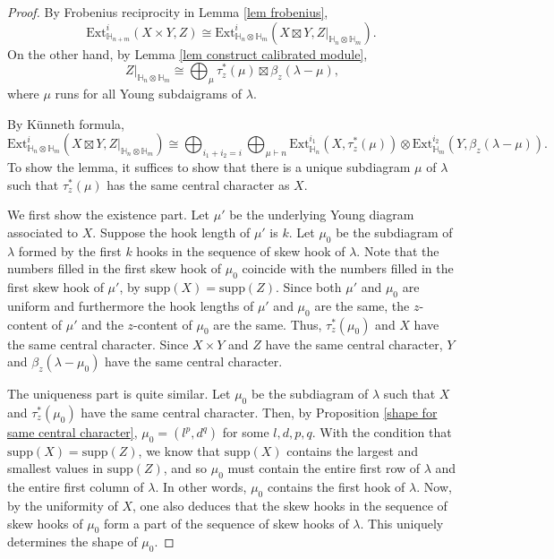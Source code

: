 \documentclass[11pt]{amsart}
\numberwithin{equation}{section}
\theoremstyle{definition}
\begin{document}
\begin{proof}
By Frobenius reciprocity in Lemma \ref{lem frobenius}, 
\[  \mathrm{Ext}^i_{\mathbb H_{n+m}}(X \times Y, Z) \cong \mathrm{Ext}^i_{\mathbb H_n \otimes \mathbb H_m}(X\boxtimes Y, Z|_{\mathbb H_n \otimes \mathbb H_m}) .
\
\]
On the other hand, by Lemma \ref{lem construct calibrated module},
\[ Z|_{\mathbb H_n \otimes \mathbb H_m} \cong \bigoplus_{\mu} \tau^*_z(\mu) \boxtimes \beta_z(\lambda-\mu) ,
\]
where $\mu$ runs for all Young subdaigrams of $\lambda$. 

By K\"unneth formula, 
\begin{equation}
\mathrm{Ext}^i_{\mathbb H_n \otimes \mathbb H_m}(X\boxtimes Y, Z|_{\mathbb H_n \otimes \mathbb H_m}) \cong \bigoplus_{i_1+i_2=i} \bigoplus_{\mu \vdash n} \mathrm{Ext}^{i_1}_{\mathbb H_n}(X, \tau^*_z(\mu)) \otimes \mathrm{Ext}^{i_2}_{\mathbb H_m}(Y, \beta_z(\lambda-\mu)) . 
\end{equation}
To show the lemma, it suffices to show that there is a unique subdiagram $\mu$ of \(\lambda\) such that $\tau_z^*(\mu)$ has the same central character as $X$.

We first show the existence part. Let \(\mu'\) be the underlying Young diagram associated to \(X\). Suppose the hook length of \(\mu'\) is \(k\). Let \(\mu_0\) be the subdiagram of \(\lambda\) formed by the first \(k\) hooks in the sequence of skew hook of \(\lambda\). Note that the numbers filled in the first skew hook of \(\mu_0\) coincide with the numbers filled in the first skew hook of \(\mu'\), by \(\mathrm{supp}(X)=\mathrm{supp}(Z)\). Since both \(\mu'\) and \(\mu_0\) are uniform and furthermore the hook lengths of \(\mu'\) and \(\mu_0\) are the same, the \(z\)-content of \(\mu'\) and the \(z\)-content of \(\mu_0\) are the same. Thus, \(\tau_z^*(\mu_0)\) and \(X\) have the same central character. Since \(X\times Y\) and \(Z\) have the same central character, \(Y\) and \(\beta_z(\lambda-\mu_0)\) have the same central character.

The uniqueness part is quite similar. Let \(\mu_0\) be the subdiagram of \(\lambda\) such that \(X\) and \(\tau_z^*(\mu_0)\) have the same central character. Then, by Proposition \ref{shape for same central character}, \(\mu_0=(l^p, d^q)\) for some \(l,d,p,q\). With the condition that $\mathrm{supp}(X)=\mathrm{supp}(Z)$, we know that $\mathrm{supp}(X)$ contains the largest and smallest values in $\mathrm{supp}(Z)$, and so $\mu_0$ must contain the entire first row of $\lambda$ and the entire first column of $\lambda$. In other words, $\mu_0$ contains the first hook of $\lambda$. Now, by the uniformity of $X$, one also deduces that the skew hooks in the sequence of skew hooks of $\mu_0$ form a part of the sequence of skew hooks of $\lambda$. This uniquely determines the shape of \(\mu_0\).
\end{proof}
\end{document}
